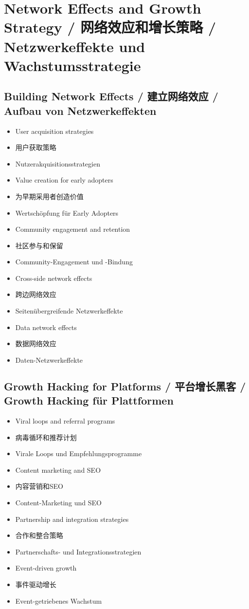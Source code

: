 \section{Network Effects and Growth Strategy / 网络效应和增长策略 / Netzwerkeffekte und Wachstumsstrategie}

\subsection{Building Network Effects / 建立网络效应 / Aufbau von Netzwerkeffekten}
\begin{itemize}
    \item User acquisition strategies
    \item 用户获取策略
    \item Nutzerakquisitionsstrategien
    \item Value creation for early adopters
    \item 为早期采用者创造价值
    \item Wertschöpfung für Early Adopters
    \item Community engagement and retention
    \item 社区参与和保留
    \item Community-Engagement und -Bindung
    \item Cross-side network effects
    \item 跨边网络效应
    \item Seitenübergreifende Netzwerkeffekte
    \item Data network effects
    \item 数据网络效应
    \item Daten-Netzwerkeffekte
\end{itemize}

\subsection{Growth Hacking for Platforms / 平台增长黑客 / Growth Hacking für Plattformen}
\begin{itemize}
    \item Viral loops and referral programs
    \item 病毒循环和推荐计划
    \item Virale Loops und Empfehlungsprogramme
    \item Content marketing and SEO
    \item 内容营销和SEO
    \item Content-Marketing und SEO
    \item Partnership and integration strategies
    \item 合作和整合策略
    \item Partnerschafts- und Integrationsstrategien
    \item Event-driven growth
    \item 事件驱动增长
    \item Event-getriebenes Wachstum
\end{itemize}

